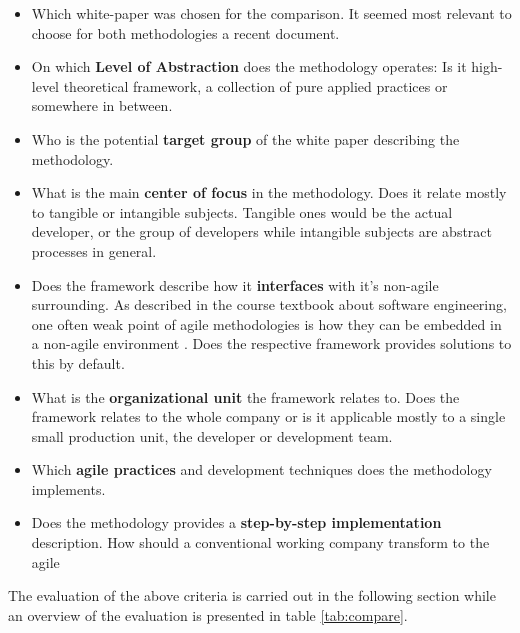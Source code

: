 \documentclass[a4paper,11pt,twoside]{article}
\begin{document}
\begin{itemize}
\item Which white-paper was chosen for the comparison. It seemed most relevant to choose for both methodologies a recent document.

\item On which \textbf{Level of Abstraction} does the methodology operates: Is it high-level theoretical framework, a collection of pure applied practices or somewhere in between.

\item Who is the potential \textbf{target group} of the white paper describing the methodology.

\item What is the main \textbf{center of focus} in the methodology. Does it relate mostly to tangible or intangible subjects. Tangible ones would be the actual developer, or the group of developers while intangible subjects are abstract processes in general. 

\item Does the framework describe how it \textbf{interfaces} with it's non-agile surrounding. As described in the course textbook about software engineering, one often weak point of agile methodologies is how they can be embedded in a non-agile environment \cite[p.91 ]{sommerville2016}. Does the respective framework provides solutions to this by default.

\item What is the \textbf{organizational unit} the framework relates to. Does the framework relates to the whole company or is it applicable mostly to a single small production unit, the developer or development team.

\item Which \textbf{agile practices} and development techniques does the methodology implements. 

\item Does the methodology provides a \textbf{step-by-step implementation} description. How should a conventional working company transform to the agile 
\end{itemize}

The evaluation of the above criteria is carried out in the following section while an overview of the evaluation is presented in table \ref{tab:compare}.
\end{document}
